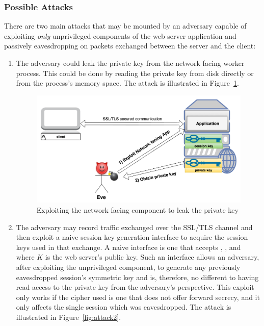 \documentclass[../main.tex]{subfiles}
\begin{document}
\subsubsection*{Possible Attacks}

There are two main attacks that may be mounted by an adversary capable
of exploiting \textit{only} unprivileged components of the web
server application and passively eavesdropping on packets exchanged
between the server and the client:
 
\begin{enumerate}
  \item The adversary could leak the private key from the network
    facing worker process. This could be done by reading the private key
    from disk directly or from the process's memory space. The attack is
    illustrated in Figure~\ref{fig:attack1}.

    \begin{figure}[H] \centering
      \includegraphics[scale=0.15]{images/attack1.png}
      \caption{Exploiting the network facing component to leak the
        private key}
      \label{fig:attack1}
    \end{figure}

  \item The adversary may record traffic exchanged over the SSL/TLS
    channel and then exploit a naive session key generation interface to
    acquire the session keys used in that exchange. A naive interface is
    one that accepts \crandom, \srandom, and \premaster~ where $K$ is the
    web server's public key.  Such an interface allows an adversary, after
    exploiting the unprivileged component, to generate any previously
    eavesdropped session's symmetric key and is, therefore, no different
    to having read access to the private key from the adversary's
    perspective. This exploit only works if the cipher used is one that
    does not offer forward secrecy, and it only affects the single session
    which was eavesdropped. The attack is illustrated in
    Figure~\ref{fig:attack2}.


\end{enumerate}
\end{document}
